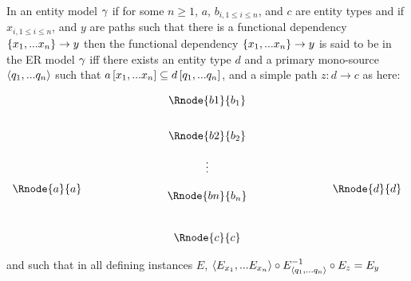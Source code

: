 \iffalse
\begin{definition} %
In an entity model $\genericmodel$, a functional dependency $\{x_1,...x_n\} \morph y$
is said to be elementary if there is no  subset $X' \subset$, such that $X' \morph y$.
\end{definition}
\fi


\begin{definition}
\noindent In an entity model $\genericmodel$  
if for some $n \geq 1$, $a$, $b_{i, 1 \leq i \leq n}$,  and $c$ are entity types and 
if  $x_{i, 1 \leq i \leq n}$, and $y$ are paths such
that there is a functional dependency $\{x_1,...x_n\} \morph y$
 then the functional dependency $\{x_1,...x_n\} \morph y$ is said to be  in the ER model $\genericmodel$ iff  there exists an entity type $d$ and a primary mono-source
$\langle q_1,...q_n\rangle$  such that $a\left[x_1,...x_n\right]\subseteq d\left[q_1,...q_n\right]$, and a simple
path $z:d\rightarrow c$ as here:

\setlength{\arraycolsep}{.2cm}
\begin{center}
$
\begin{array}{cp{2cm}c p{2cm} c}
             &  & \Rnode{b1}{b_1} & &               \\ [0.7cm]
						 &  & \Rnode{b2}{b_2} & &               \\ [0.4cm]
						 &  &     \vdots      & &               \\ [0.2cm]
\Rnode{a}{a} &  &                 & & \Rnode{d}{d}  \\ [-0.2cm]
             &  & \Rnode{bn}{b_n} & &               \\ [0.9cm]
             &  & \Rnode{c}{c}    & &               \\
\end{array}
$
\end{center}

and such that in all defining instances $E$, 
$\langle E_{x_1},...E_{x_n}\rangle \circ E^{-1}_{\langle q_1,...q_n\rangle}\circ E_z = E_y$
\end{definition}
 
